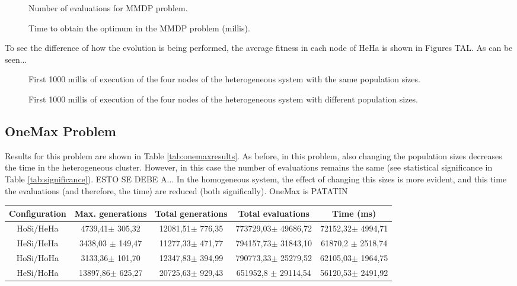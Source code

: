 \documentclass{sig-alternate}
\begin{document}
\begin{figure}
\centering
{}
\caption{Number of evaluations for MMDP problem.}
\label{fig:evalsMMDP}
\end{figure}

\begin{figure}
\centering
{}
\caption{Time to obtain the optimum in the MMDP problem (millis).}
\label{fig:timeMMDP}
\end{figure}

To see the difference of how the evolution is being performed, the average fitness in each node of HeHa is shown in Figures TAL. As can be seen...

\begin{figure}
\centering
{}
\caption{First 1000 millis of execution of the four nodes of the heterogeneous system with the same population sizes.}
\end{figure}

\begin{figure}
\centering
{}
\caption{First 1000 millis of execution of the four nodes of the heterogeneous system with different population sizes.}
\end{figure}

\subsection{OneMax Problem}

Results for this problem are shown in Table \ref{tab:onemaxresults}. As before, in this problem, also changing the population sizes decreases the time in the heterogeneous cluster. However, in this case the number of evaluations remains the same (see statistical significance in Table \ref{tab:significance}). ESTO SE DEBE A... In the homogeneous system, the effect of changing this sizes is more evident, and this time the evaluations (and therefore, the time) are reduced (both significally). OneMax is PATATIN

\begin{table*}
\centering
\caption{Results for the OneMax problem.}
\begin{tabular}{|c|c|c|c|c|} \hline
Configuration	& Max. generations			& Total generations			& 	Total evaluations			& Time (ms) \\ \hline
HoSi/HeHa		& 4739,41$\pm$	305,32 		&	12081,51$\pm$	776,35 	&	773729,03$\pm$	49686,72 	&	72152,32$\pm$	4994,71 \\ \hline
HeSi/HeHa		&	3438,03 $\pm$	149,47 &	11277,33$\pm$	471,77 &	794157,73$\pm$	31843,10 	&	61870,2	$\pm$ 2518,74 \\ \hline
HoSi/HoHa		&	3133,36$\pm$	101,70 	&	12347,83$\pm$	394,99 	&	790773,33$\pm$	25279,52 	&	62105,03$\pm$	1964,75 \\ \hline
HeSi/HoHa		& 13897,86$\pm$	625,27 		&	20725,63$\pm$	929,43 	&	651952,8 $\pm$	29114,54	&	56120,53$\pm$	2491,92 \\ \hline
\end{tabular}
\label{tab:onemaxresults}
\end{table*}
\end{document}
